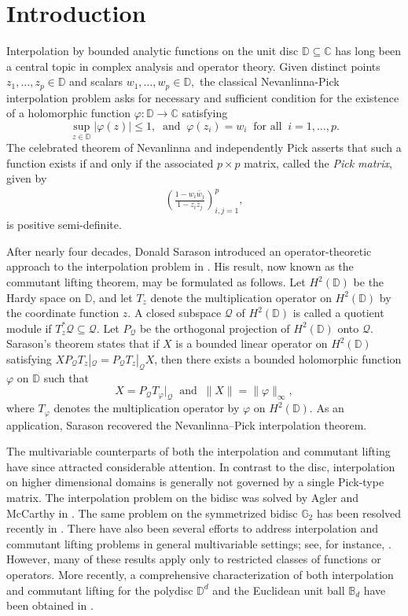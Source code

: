 \documentclass[12pt,reqno]{amsart}
\theoremstyle{remark}
\theoremstyle{definition}
\newcommand{\beq}{\begin{eqnarray}}
\newcommand{\eeq}{\end{eqnarray}}
\begin{document}
\section{Introduction}
Interpolation by bounded analytic functions on the unit disc $\mathbb D \subseteq \mathbb C$ has long been a central topic in complex analysis and operator theory. Given distinct points $z_1,\ldots, z_p\in \mathbb D$ and scalars $w_1,\ldots, w_p \in \mathbb D,$ the classical Nevanlinna-Pick interpolation problem asks for necessary and sufficient condition for the existence of a holomorphic function $\varphi: \mathbb D \to \mathbb C$ satisfying $$\sup_{z\in \mathbb D} |\varphi(z)|\leq 1, \;\;\text{and}\;\;\varphi(z_i)=w_i\;\; \text{for all}\;\; i=1,\ldots, p.$$
The celebrated theorem of Nevanlinna and independently Pick asserts that such a function exists if and only if the associated $p\times p$ matrix, called the {\it  Pick matrix}, given by 
\beq \label{pick matrix} \left(\frac{1-w_i \bar{w}_j}{1-z_i \bar{z}_j}
\right)_{i,j=1}^p,\eeq is positive semi-definite.  

After nearly four decades, Donald Sarason introduced an operator-theoretic approach to the interpolation problem in \cite{DS1967}. His result, now known as the commutant lifting theorem, may be formulated as follows. Let $H^2(\mathbb D)$ be the Hardy space on $\mathbb D$, and let $T_{z}$ denote the multiplication operator on $H^2(\mathbb D)$ by the coordinate function $z$. A closed subspace $\mathcal{Q}$ of $H^2(\mathbb D)$ is called a quotient module if $T_{z}^* \mathcal{Q}\subseteq \mathcal{Q}.$ Let $P_{\mathcal{Q}}$ be the orthogonal projection of $H^2(\mathbb D)$ onto $\mathcal{Q}.$ 
Sarason’s theorem states that if $X$ is a bounded linear operator on $H^2(\mathbb D)$ satisfying $X P_{\mathcal{Q}} T_{z}|_{\mathcal{Q}}= P_{\mathcal{Q}} T_z |_{\mathcal{Q}}X$, then there exists a bounded holomorphic function $\varphi$ on $\mathbb D$ such that $$X=P_{\mathcal{Q}} T_{\varphi}|_{\mathcal{Q}} \;\; \text{and}\;\; \|X\|=\|\varphi\|_{\infty},$$ where $T_{\varphi}$ denotes the multiplication operator by $\varphi$ on $H^2(\mathbb D).$ As an application, Sarason recovered the Nevanlinna–Pick interpolation theorem.

The multivariable counterparts of both the interpolation and commutant lifting have since attracted considerable attention. In contrast to the disc, interpolation on higher dimensional domains is generally not governed by a single Pick-type matrix. The interpolation problem on the bidisc was solved by Agler and McCarthy in \cite{AM1999}. The same problem on the symmetrized bidisc $\mathbb G_2$ has been resolved recently in \cite{AY2017, BS2018}. 
There have also been several efforts to address interpolation and commutant lifting problems in general multivariable settings; see, for instance, \cite{BT1998, BLTT1999, BB2004}. However, many of these results apply only to restricted classes of functions or operators. More recently, a comprehensive characterization of both interpolation and commutant lifting for the polydisc $\mathbb D^d$
and the Euclidean unit ball $\mathbb B_d$ have been obtained in \cite{DeS2026, BDS2025}. 
\end{document}
